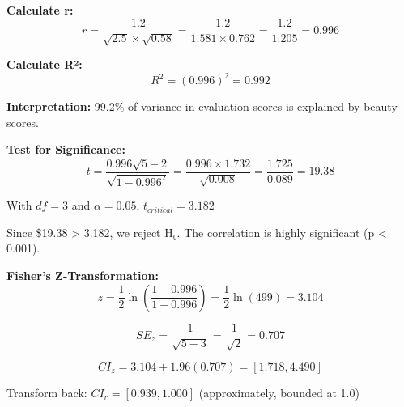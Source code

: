 \documentclass[11pt]{article}
\begin{document}
\textbf{Calculate r:}
\[r = \frac{1.2}{\sqrt{2.5} \times \sqrt{0.58}} = \frac{1.2}{1.581 \times 0.762} = \frac{1.2}{1.205} = 0.996\]

\textbf{Calculate R²:} \[R^2 = (0.996)^2 = 0.992\]

\textbf{Interpretation:} 99.2\% of variance in evaluation scores is
explained by beauty scores.

\textbf{Test for Significance:}
\[t = \frac{0.996\sqrt{5-2}}{\sqrt{1-0.996^2}} = \frac{0.996 \times 1.732}{\sqrt{0.008}} = \frac{1.725}{0.089} = 19.38\]

With \(df = 3\) and \(\alpha = 0.05\), \(t_{critical} = 3.182\)

Since \$19.38 \textgreater{} 3.182, we reject H₀. The correlation is
highly significant (p \textless{} 0.001).

\textbf{Fisher's Z-Transformation:}
\[z = \frac{1}{2}\ln\left(\frac{1+0.996}{1-0.996}\right) = \frac{1}{2}\ln(499) = 3.104\]

\[SE_z = \frac{1}{\sqrt{5-3}} = \frac{1}{\sqrt{2}} = 0.707\]

\[CI_z = 3.104 \pm 1.96(0.707) = [1.718, 4.490]\]

Transform back: \(CI_r = [0.939, 1.000]\) (approximately, bounded at
1.0)
\end{document}
